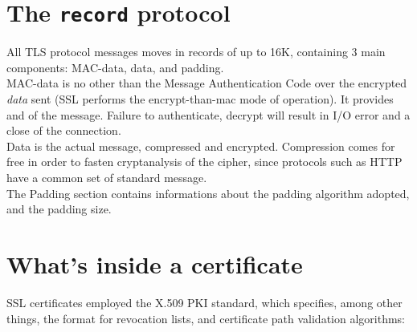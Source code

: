 \section{The \texttt{record} protocol}
All TLS protocol messages moves in records of up to 16K, containing 3
main components: MAC-data, data, and padding.
\\
{MAC-data} is no other than the Message Authentication Code over the
encrypted \emph{data} sent
(SSL performs the encrypt-than-mac mode of operation).
It provides  and  of the message.
Failure to authenticate, decrypt will result in I/O error and a close of the
connection.
\\
{Data} is the actual message, compressed and encrypted. Compression comes
for free in order to fasten cryptanalysis of the cipher, since protocols such
as HTTP have a common set of standard message.
\\
The {Padding} section contains informations about the padding algorithm
adopted, and the padding size.

\section{What's inside a certificate \label{sec:ssl:x509}}
SSL certificates employed the X.509 PKI standard, which specifies, among other
things, the format for revocation lists, and certificate path validation
algorithms:
\\
\begin{center}
\end{center}

